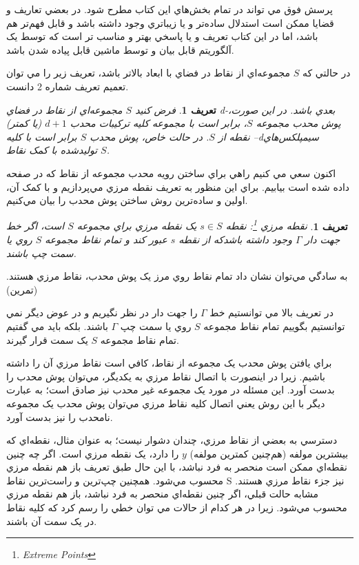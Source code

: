 \documentclass{book}
\newtheorem{defn}[section]{تعریف}
\begin{document}
پرسش فوق مي تواند در تمام بخش‌هاي اين کتاب مطرح شود. در بعضي تعاريف و قضايا ممکن است استدلال ساده‌تر و يا زيباتري وجود داشته باشد و قابل فهم‌تر هم باشد، اما در اين کتاب تعريف و يا پاسخي بهتر و مناسب تر است که توسط يک آلگوريتم قابل بيان و توسط ماشين قابل پياده شدن باشد. 

در حالتي که $S$ مجموعه‌اي از نقاط در فضاي با ابعاد بالاتر باشد، تعريف زير را مي توان تعميم تعريف شماره 2 دانست.

\begin{defn}
    فرض کنيد $S$ مجموعه‌اي از نقاط در فضاي d-بعدي باشد. در اين صورت، پوش محدب مجموعه $S$، برابر است با مجموعه کليه ترکيبات محدب  $d+1$ (يا کمتر) نقطه از $S$. در حالت خاص، پوش محدب $S$ برابر است با کليه –dسيمپلکس‌هاي توليدشده با کمک نقاط $S$.
\end{defn}


اکنون سعي مي کنيم راهي براي ساختن رويه محدب مجموعه از نقاط که در صفحه داده شده است بيابيم. براي اين منظور به تعريف نقطه مرزي مي‌پردازيم و با کمک آن، اولين و ساده‌ترين روش ساختن پوش محدب را بيان مي‌کنيم.

\begin{defn}
    نقطه مرزي \footnote{Extreme Points}:
    نقطه $s \in S$ يک نقطه مرزي براي مجموعه $S$ است، اگر خط جهت دار $\Gamma$ وجود داشته باشدکه از نقطه $s$ عبور کند و تمام نقاط مجموعه $S$ روي يا سمت چپ  باشند.
\end{defn}

به سادگي مي‌توان نشان داد تمام نقاط روي مرز يک پوش محدب، نقاط مرزي هستند. (تمرين)

در تعريف بالا مي توانستيم خط $\Gamma$ را جهت دار در نظر نگيريم و در عوض ديگر نمي توانستيم بگوييم تمام نقاط مجموعه $S$ روي يا سمت چپ $\Gamma$ باشند. بلکه بايد مي گفتيم تمام نقاط مجموعه $S$ يک سمت  قرار گيرند.

براي يافتن پوش محدب يک مجموعه از نقاط، کافي است نقاط مرزي آن را داشته باشيم. زيرا در اينصورت با اتصال نقاط مرزي به يکديگر، مي‌توان پوش محدب را بدست آورد. اين مسئله در مورد يک مجموعه غير محدب نيز صادق است؛ به عبارت ديگر با اين روش يعني اتصال کليه نقاط مرزي مي‌توان پوش محدب يک مجموعه نامحدب را نيز بدست آورد.

دسترسي به بعضي از نقاط مرزي، چندان دشوار نيست؛ به عنوان مثال، نقطه‌اي که بيشترين مولفه (هم‌چنين کمترين مولفه) $y$ را دارد، يک نقطه مرزي است. اگر چه چنين نقطه‌اي ممکن است منحصر به فرد نباشد، با اين حال طبق تعريف باز هم نقطه مرزي محسوب مي‌شود. همچنين چپ‌ترين و راست‌ترين نقاط S نيز جزء نقاط مرزي هستند. مشابه حالت قبلي، اگر چنين نقطه‌اي منحصر به فرد نباشد، باز هم نقطه مرزي محسوب مي‌شود. زيرا در هر کدام از حالات مي توان خطي را رسم کرد که کليه نقاط در يک سمت آن باشند.
\end{document}
